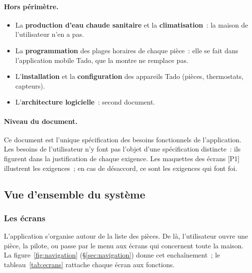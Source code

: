 \paragraph{Hors périmètre.}
\begin{itemize}
  \item La \textbf{production d'eau chaude sanitaire} et la \textbf{climatisation}~: la
        maison de l'utilisateur n'en a pas.
  \item La \textbf{programmation} des plages horaires de chaque pièce~: elle se fait dans
        l'application mobile Tado, que la montre ne remplace pas.
  \item L'\textbf{installation} et la \textbf{configuration} des appareils Tado (pièces,
        thermostats, capteurs).
  \item L'\textbf{architecture logicielle}~: second document.
\end{itemize}

\paragraph{Niveau du document.} Ce document est l'unique spécification des besoins
fonctionnels de l'application. Les besoins de l'utilisateur n'y font pas l'objet d'une
spécification distincte~: ils figurent dans la justification de chaque exigence. Les
maquettes des écrans [P1] illustrent les exigences~; en cas de désaccord, ce sont les
exigences qui font foi.

\subsection{Vue d'ensemble du système}

\subsubsection{Les écrans}

L'application s'organise autour de la liste des pièces. De là, l'utilisateur ouvre une pièce,
la pilote, ou passe par le menu aux écrans qui concernent toute la maison. La
figure~\ref{fig:navigation} (§\ref{sec:navigation}) donne cet enchaînement~; le
tableau~\ref{tab:ecrans} rattache chaque écran aux fonctions.

